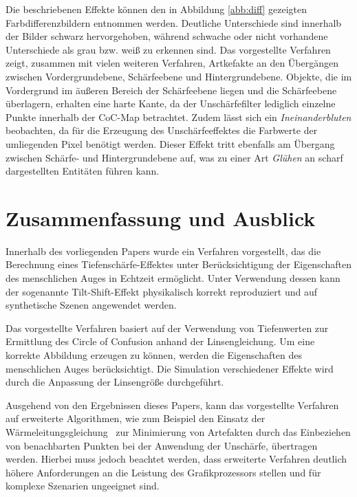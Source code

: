 \documentclass{acmsiggraph}                     %
\begin{document}
Die beschriebenen Effekte können den in Abbildung \ref{abb:diff} gezeigten Farbdifferenzbildern entnommen werden. Deutliche Unterschiede sind innerhalb der Bilder schwarz hervorgehoben, während schwache oder nicht vorhandene Unterschiede als grau bzw. weiß zu erkennen sind. Das vorgestellte Verfahren zeigt, zusammen mit vielen weiteren Verfahren, Artkefakte an den Übergängen zwischen Vordergrundebene, Schärfeebene und Hintergrundebene. Objekte, die im Vordergrund im äußeren Bereich der Schärfeebene liegen und die Schärfeebene überlagern, erhalten eine harte Kante, da der Unschärfefilter lediglich einzelne Punkte innerhalb der CoC-Map betrachtet. Zudem lässt sich ein \emph{Ineinanderbluten} beobachten, da für die Erzeugung des Unschärfeeffektes die Farbwerte der umliegenden Pixel benötigt werden. Dieser Effekt tritt ebenfalls am Übergang zwischen Schärfe- und Hintergrundebene auf, was zu einer Art \emph{Glühen} an scharf dargestellten Entitäten führen kann.

\section{Zusammenfassung und Ausblick}

Innerhalb des vorliegenden Papers wurde ein Verfahren vorgestellt, das die Berechnung eines Tiefenschärfe-Effektes unter Berücksichtigung der Eigenschaften des menschlichen Auges in Echtzeit ermöglicht. Unter Verwendung dessen kann der sogenannte Tilt-Shift-Effekt physikalisch korrekt reproduziert und auf synthetische Szenen angewendet werden.

Das vorgestellte Verfahren basiert auf der Verwendung von Tiefenwerten zur Ermittlung des Circle of Confusion anhand der Linsengleichung. Um eine korrekte Abbildung erzeugen zu können, werden die Eigenschaften des menschlichen Auges berücksichtigt. Die Simulation verschiedener Effekte wird durch die Anpassung der Linsengröße durchgeführt.

Ausgehend von den Ergebnissen dieses Papers, kann das vorgestellte Verfahren auf erweiterte Algorithmen, wie zum Beispiel den Einsatz der Wärmeleitungsgleichung~\cite{Bertalmio:2004lq,Kass:2006dq} zur Minimierung von Artefakten durch das Einbeziehen von benachbarten Punkten bei der Anwendung der Unschärfe, übertragen werden. Hierbei muss jedoch beachtet werden, dass erweiterte Verfahren deutlich höhere Anforderungen an die Leistung des Grafikprozessors stellen und für komplexe Szenarien ungeeignet sind.



\nocite{*}

\end{document}
